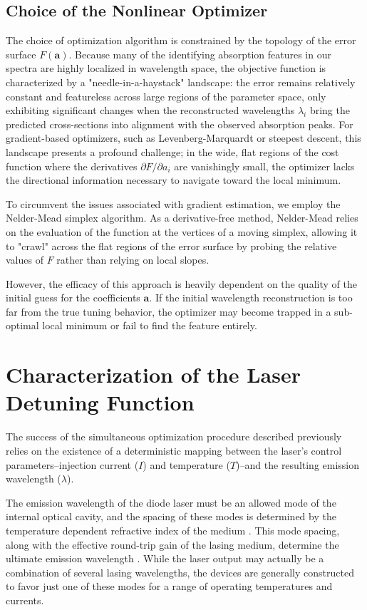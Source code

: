 \documentclass[8pt,a4paper]{report}
\begin{document}
	\subsection{Choice of the Nonlinear Optimizer}
	The choice of optimization algorithm is constrained by the topology of the error surface $F(\mathbf{a})$. Because many of the identifying absorption features in our spectra are highly localized in wavelength space, the objective function is characterized by a "needle-in-a-haystack" landscape: the error remains relatively constant and featureless across large regions of the parameter space, only exhibiting significant changes when the reconstructed wavelengths $\lambda_i$ bring the predicted cross-sections into alignment with the observed absorption peaks. For gradient-based optimizers, such as Levenberg-Marquardt or steepest descent, this landscape presents a profound challenge; in the wide, flat regions of the cost function where the derivatives $\partial F/\partial a_i$ are vanishingly small, the optimizer lacks the directional information necessary to navigate toward the local minimum.
	
	To circumvent the issues associated with gradient estimation, we employ the Nelder-Mead simplex algorithm. As a derivative-free method, Nelder-Mead relies on the evaluation of the function at the vertices of a moving simplex, allowing it to "crawl" across the flat regions of the error surface by probing the relative values of $F$ rather than relying on local slopes. 
	
	However, the efficacy of this approach is heavily dependent on the quality of the initial guess for the coefficients $\mathbf{a}$. If the initial wavelength reconstruction is too far from the true tuning behavior, the optimizer may become trapped in a sub-optimal local minimum or fail to find the feature entirely.
	
	\section{Characterization of the Laser Detuning Function}
	
	The success of the simultaneous optimization procedure described previously relies on the existence of a deterministic mapping between the laser's control parameters--injection current ($I$) and temperature ($T$)--and the resulting emission wavelength ($\lambda$).
	
	The emission wavelength of the diode laser must be an allowed mode of the internal optical cavity, and the spacing of these modes is determined by the temperature dependent refractive index of the medium \cite{book_pankove1971}. This mode spacing, along with the effective round-trip gain of the lasing medium, determine the ultimate emission wavelength \cite{book_lasers_siegman}. While the laser output may actually be a combination of several lasing wavelengths, the devices are generally constructed to favor just one of these modes for a range of operating temperatures and currents. 
	
\end{document}
